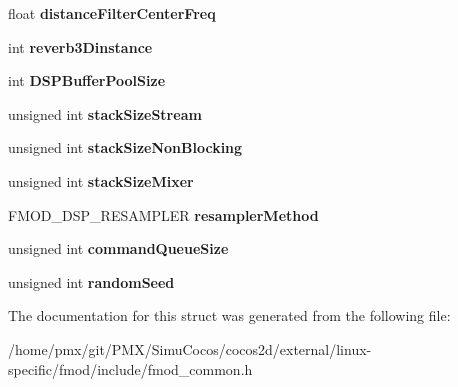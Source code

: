 \begin{DoxyCompactItemize}
$$float {\bfseries distance\+Filter\+Center\+Freq}
\item 
\mbox{\label{structFMOD__ADVANCEDSETTINGS_a3a5ab4ea4aabad2a2d37259b4f913553}} 
int {\bfseries reverb3\+Dinstance}
\item 
\mbox{\label{structFMOD__ADVANCEDSETTINGS_abee72e231aaa37f6de731d51b10d1fbc}} 
int {\bfseries D\+S\+P\+Buffer\+Pool\+Size}
\item 
\mbox{\label{structFMOD__ADVANCEDSETTINGS_a9a42dd0974e470082566598caeb14302}} 
unsigned int {\bfseries stack\+Size\+Stream}
\item 
\mbox{\label{structFMOD__ADVANCEDSETTINGS_a5f305d1fb3439073c30ae0a43dec01a6}} 
unsigned int {\bfseries stack\+Size\+Non\+Blocking}
\item 
\mbox{\label{structFMOD__ADVANCEDSETTINGS_a6c9307e0c57d231bb9671be196325c3f}} 
unsigned int {\bfseries stack\+Size\+Mixer}
\item 
\mbox{\label{structFMOD__ADVANCEDSETTINGS_aa38ed5b1d8624386170ca539779250b8}} 
F\+M\+O\+D\+\_\+\+D\+S\+P\+\_\+\+R\+E\+S\+A\+M\+P\+L\+ER {\bfseries resampler\+Method}
\item 
\mbox{\label{structFMOD__ADVANCEDSETTINGS_ab9f6edd30759fea6cb6a5ba54b3656d5}} 
unsigned int {\bfseries command\+Queue\+Size}
\item 
\mbox{\label{structFMOD__ADVANCEDSETTINGS_a183a5d91e117a0b7fd984cc82cc2c6ed}} 
unsigned int {\bfseries random\+Seed}
\end{DoxyCompactItemize}


The documentation for this struct was generated from the following file\+:\begin{DoxyCompactItemize}
\item 
/home/pmx/git/\+P\+M\+X/\+Simu\+Cocos/cocos2d/external/linux-\/specific/fmod/include/fmod\+\_\+common.\+h\end{DoxyCompactItemize}
